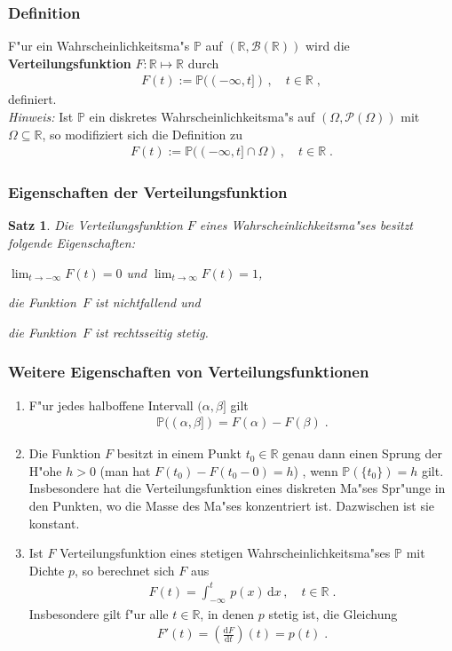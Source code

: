\documentclass[ngerman,draft,parskip=half,twoside]{scrartcl}
\newtheorem{thm}{Satz}[section]
\newcommand*{\R}{\mathbb{R}}      %
\newcommand*{\BorelM}{\mathcal{B}}  %
\newcommand*{\PotM}{\mathcal{P}}    %
\newcommand*{\WKM}{\mathbb{P}}      %
\begin{document}
\subsubsection{Definition}
F"ur ein Wahrscheinlichkeitsma"s $\WKM$ auf $(\R,\BorelM(\R))$ wird die
\textbf{Verteilungsfunktion} $F\colon\R\mapsto\R$ durch
\begin{gather}
\label{F0}
F(t):=\WKM((-\infty,t])\,,\quad t\in\R  \;,
\end{gather}
definiert.\\
\textit{Hinweis:} Ist $\WKM$ ein diskretes Wahrscheinlichkeitsma"s auf $(\Omega,\PotM(\Omega))$ mit $\Omega\subseteq\R$,
so modifiziert sich die Definition zu
\begin{gather*}
  F(t):=\WKM((-\infty,t]\cap\Omega)\,,\quad t\in\R  \;.
\end{gather*}
\subsubsection{Eigenschaften der Verteilungsfunktion}
\begin{thm}
\label{VF}
Die Verteilungsfunktion $F$ eines Wahrscheinlichkeitsma"ses besitzt folgende Eigenschaften:
  \begin{eigenschaften}
   \item $\lim_{t\to -\infty} F(t)=0$ und $\lim_{t\to\infty} F(t)=1$,
   \item die Funktion~$F$ ist nichtfallend und
   \item die Funktion~$F$ ist rechtsseitig stetig.
  \end{eigenschaften}
\end{thm}
\subsubsection{Weitere Eigenschaften von Verteilungsfunktionen}
\begin{enumerate}[label=(\alph*)]
 \item
F"ur jedes halboffene Intervall $(\alpha,\beta]$ gilt
  \begin{gather*}
    \WKM((\alpha,\beta])= F(\alpha)-F(\beta)\;.
  \end{gather*}
 \item
Die Funktion $F$ besitzt in einem Punkt $t_0\in\R$ genau dann einen Sprung der H"ohe
$h>0$ (man hat $F(t_0)-F(t_0-0)=h$) , wenn $\WKM(\{t_0\})=h$ gilt. Insbesondere hat die
Verteilungsfunktion eines diskreten Ma"ses Spr"unge in den Punkten, wo die Masse
des Ma"ses konzentriert ist. Dazwischen ist sie konstant.
 \item
Ist $F$ Verteilungsfunktion eines stetigen Wahrscheinlichkeitsma"ses $\WKM$ mit Dichte $p$, so berechnet
sich $F$ aus
  \begin{gather*}
    F(t)=\int_{-\infty}^t\,p(x)\,\mathrm d x\,,\quad t\in\R\;.
  \end{gather*}
Insbesondere gilt f"ur alle $t\in\R$, in denen $p$ stetig ist, die Gleichung
  \begin{gather*}
    F'(t)=\left(\frac{\mathrm d F}{\mathrm d t} \right)(t)= p(t)\;.
  \end{gather*}
\end{enumerate}
\end{document}
